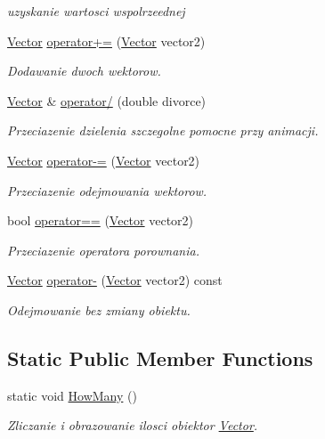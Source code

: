 \begin{DoxyCompactItemize}
\begin{DoxyCompactList}\small\item\em uzyskanie wartosci wspolrzeednej \end{DoxyCompactList}\item 
\hyperlink{class_vector}{Vector} \hyperlink{class_vector_a279d70d4570db9c244fe9e2cb74e1214}{operator+=} (\hyperlink{class_vector}{Vector} vector2)
\begin{DoxyCompactList}\small\item\em Dodawanie dwoch wektorow. \end{DoxyCompactList}\item 
\hyperlink{class_vector}{Vector} \& \hyperlink{class_vector_a78da39dae1595a16bf12245bc29a9beb}{operator/} (double divorce)
\begin{DoxyCompactList}\small\item\em Przeciazenie dzielenia szczegolne pomocne przy animacji. \end{DoxyCompactList}\item 
\hyperlink{class_vector}{Vector} \hyperlink{class_vector_a71f655b6eee1e552655d381a85aa9719}{operator-\/=} (\hyperlink{class_vector}{Vector} vector2)
\begin{DoxyCompactList}\small\item\em Przeciazenie odejmowania wektorow. \end{DoxyCompactList}\item 
bool \hyperlink{class_vector_a416135596d86716064a1776141b2aa31}{operator==} (\hyperlink{class_vector}{Vector} vector2)
\begin{DoxyCompactList}\small\item\em Przeciazenie operatora porownania. \end{DoxyCompactList}\item 
\hyperlink{class_vector}{Vector} \hyperlink{class_vector_ac661330851f69358c8fb4bdc3de0412e}{operator-\/} (\hyperlink{class_vector}{Vector} vector2) const 
\begin{DoxyCompactList}\small\item\em Odejmowanie bez zmiany obiektu. \end{DoxyCompactList}\end{DoxyCompactItemize}
\subsection*{Static Public Member Functions}
\begin{DoxyCompactItemize}
\item 
static void \hyperlink{class_vector_aba3f9dd718ed08bc7d91471d5856bd1c}{How\+Many} ()
\begin{DoxyCompactList}\small\item\em Zliczanie i obrazowanie ilosci obiektor \hyperlink{class_vector}{Vector}. \end{DoxyCompactList}\end{DoxyCompactItemize}
